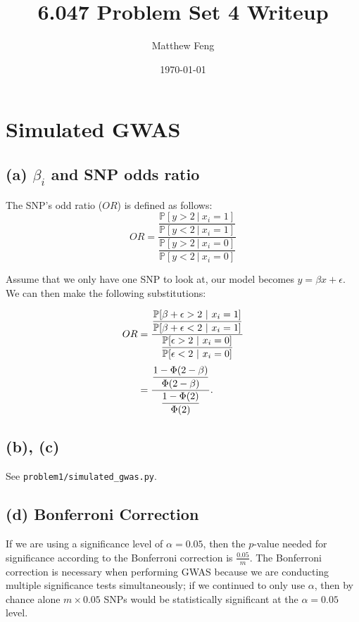 \documentclass{article}[11pt]
\title{6.047 Problem Set 4 Writeup}
\author{Matthew Feng}
\date{\today}
\begin{document}
\maketitle

\section{Simulated GWAS}

\subsection*{(a) $\beta_i$ and SNP odds ratio}
The SNP's odd ratio ($OR$) is defined as follows:
\[
    OR =
    \dfrac{
        \dfrac{
            \mathbb{P}[y > 2\ |\ x_i = 1]
        }
        {
            \mathbb{P}[y < 2\ |\ x_i = 1]
        }
    }
    {
        \dfrac{
            \mathbb{P}[y > 2\ |\ x_i = 0]
        }
        {
            \mathbb{P}[y < 2\ |\ x_i = 0]
        }
    }
\]

Assume that we only have one SNP to look at, our model
becomes $y = \beta x + \epsilon$. We can then make the following
substitutions:

\begin{align}
    OR & =
    \dfrac{
        \dfrac{
            \mathbb{P}[\beta + \epsilon > 2\ |\ x_i = 1]
        }
        {
            \mathbb{P}[\beta + \epsilon < 2\ |\ x_i = 1]
        }
    }
    {
        \dfrac{
            \mathbb{P}[\epsilon > 2\ |\ x_i = 0]
        }
        {
            \mathbb{P}[\epsilon < 2\ |\ x_i = 0]
        }
    }\\
    \rule{0pt}{7ex} & =
    \dfrac{
        \dfrac{
            1 - \Phi(2 - \beta)
        }
        {
            \Phi(2 - \beta)
        }
    }
    {
        \dfrac{
            1 - \Phi(2)
        }
        {
            \Phi(2)
        }
    }.
\end{align}

\subsection*{(b), (c)}
See {\tt problem1/simulated\_gwas.py}.

\subsection*{(d) Bonferroni Correction}
If we are using a significance level of $\alpha = 0.05$, then
the $p$-value needed for significance according to the
Bonferroni correction is $\frac{0.05}{m}$. The Bonferroni
correction is necessary when performing GWAS
because we are conducting multiple significance tests
simultaneously; if we continued to only use $\alpha$, then
by chance alone $m \times 0.05$ SNPs would be
statistically significant at the $\alpha = 0.05$ level.
\end{document}

